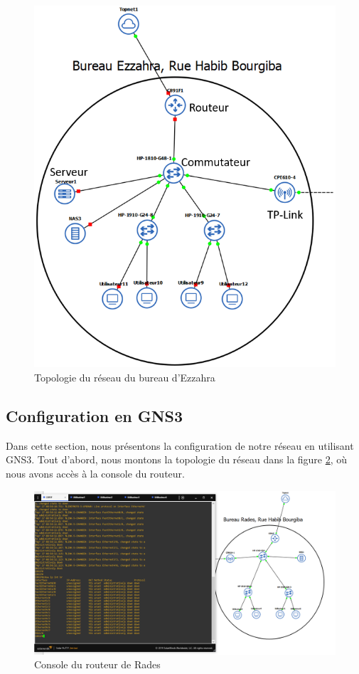 \begin{figure}[H]
\centering
\includegraphics[width=15cm]{Images/BEzzahra-Topologie.png}
\caption{Topologie du réseau du bureau d'Ezzahra}
\label{Chap2.5.1}
\end{figure}



\subsection{Configuration en GNS3}

Dans cette section, nous présentons la configuration de notre réseau en utilisant GNS3. Tout d'abord, nous montons la topologie du réseau dans la figure \ref{Chap2.2.1}, où nous avons accès à la console du routeur. 


\begin{figure}[H]
 \centering
    \includegraphics[width=16cm]{Images/BRades-Topologie1.png}
    \caption{Console du routeur de Rades}
    \label{Chap2.2.1}
\end{figure}


